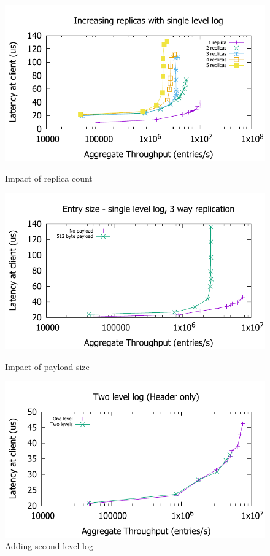 \documentclass[pageno]{jpaper}
\begin{document}
\begin{figure}
\begin{minipage}{.33\textwidth}
  \includegraphics[scale=0.45]{results2/replicas.pdf}
  \caption{Impact of replica count}
  \label{fig:replicas}
\end{minipage}
\begin{minipage}{.33\textwidth}
  \includegraphics[scale=0.45]{results2/512.pdf}
  \caption{Impact of payload size}
  \label{fig:payload}
\end{minipage}
\begin{minipage}{.33\textwidth}
  \includegraphics[scale=0.45]{results2/flashlog.pdf}
  \caption{Adding second level log}
  \label{fig:flashlog}
\end{minipage}
\end{figure}
\end{document}
